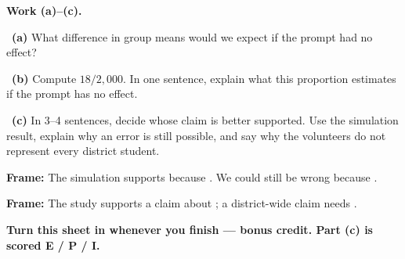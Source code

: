\documentclass[11pt]{article}
\begin{document}
\newpage
\textbf{Work (a)--(c).}\par\smallskip

~\textbf{(a)} What difference in group means would we expect if the prompt had no effect?\par
\workspace{0.7in}

~\textbf{(b)} Compute $18/2{,}000$. In one sentence, explain what this proportion estimates if the prompt has no effect.\par
\workspace{1.4in}

~\textbf{(c)} In 3--4 sentences, decide whose claim is better supported. Use the simulation result, explain why an error is still possible, and say why the volunteers do not represent every district student.\par
\workspace{2.0in}

\begin{sentenceframebox}\raggedright\textbf{Frame:} The simulation supports \blank[1.2in] because \blank[2.0in]. We could still be wrong because \blank[2.0in].\end{sentenceframebox}

\begin{sentenceframebox}\raggedright\textbf{Frame:} The study supports a claim about \blank[1.8in]; a district-wide claim needs \blank[1.8in].\end{sentenceframebox}

\textbf{Turn this sheet in whenever you finish --- bonus credit. Part (c) is scored E / P / I.}\par
\end{document}
